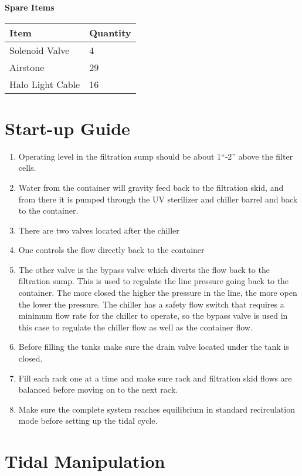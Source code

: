 \documentclass[]{book}
\providecommand{\tightlist}{%
  \setlength{\itemsep}{0pt}\setlength{\parskip}{0pt}}
\begin{document}
 \textbf{Spare Items}

\begin{longtable}[]{@{}ll@{}}
\toprule
Item & Quantity\tabularnewline
\midrule
\endhead
Solenoid Valve & 4\tabularnewline
Airstone & 29\tabularnewline
Halo Light Cable & 16\tabularnewline
\bottomrule
\end{longtable}

\chapter{Start-up Guide}\label{start-up-guide}

\begin{enumerate}
\def\labelenumi{\arabic{enumi}.}
\tightlist
\item
  Operating level in the filtration sump should be about 1``‐2'' above
  the filter cells.
\item
  Water from the container will gravity feed back to the filtration
  skid, and from there it is pumped through the UV sterilizer and
  chiller barrel and back to the container.
\item
  There are two valves located after the chiller
\item
  One controls the flow directly back to the container
\item
  The other valve is the bypass valve which diverts the flow back to the
  filtration sump. This is used to regulate the line pressure going back
  to the container. The more closed the higher the pressure in the line,
  the more open the lower the pressure. The chiller has a safety flow
  switch that requires a minimum flow rate for the chiller to operate,
  so the bypass valve is used in this case to regulate the chiller flow
  as well as the container flow.
\item
  Before filling the tanks make sure the drain valve located under the
  tank is closed.
\item
  Fill each rack one at a time and make sure rack and filtration skid
  flows are balanced before moving on to the next rack.
\item
  Make sure the complete system reaches equilibrium in standard
  recirculation mode before setting up the tidal cycle.
\end{enumerate}

\chapter{Tidal Manipulation}\label{tidal-manipulation}
\end{document}
